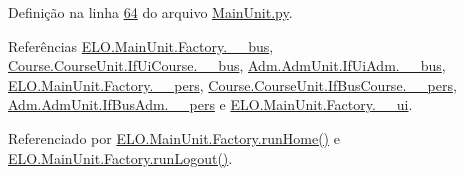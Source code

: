 Definição na linha \hyperlink{MainUnit_8py_source_l00064}{64} do arquivo \hyperlink{MainUnit_8py_source}{Main\-Unit.\-py}.



Referências \hyperlink{MainUnit_8py_source_l00041}{E\-L\-O.\-Main\-Unit.\-Factory.\-\_\-\-\_\-bus}, \hyperlink{CourseUnit_8py_source_l00056}{Course.\-Course\-Unit.\-If\-Ui\-Course.\-\_\-\-\_\-bus}, \hyperlink{AdmUnit_8py_source_l00067}{Adm.\-Adm\-Unit.\-If\-Ui\-Adm.\-\_\-\-\_\-bus}, \hyperlink{MainUnit_8py_source_l00042}{E\-L\-O.\-Main\-Unit.\-Factory.\-\_\-\-\_\-pers}, \hyperlink{CourseUnit_8py_source_l00100}{Course.\-Course\-Unit.\-If\-Bus\-Course.\-\_\-\-\_\-pers}, \hyperlink{AdmUnit_8py_source_l00112}{Adm.\-Adm\-Unit.\-If\-Bus\-Adm.\-\_\-\-\_\-pers} e \hyperlink{MainUnit_8py_source_l00040}{E\-L\-O.\-Main\-Unit.\-Factory.\-\_\-\-\_\-ui}.



Referenciado por \hyperlink{classELO_1_1MainUnit_1_1Factory_a766943202ba781821cf749ca0fb133ba}{E\-L\-O.\-Main\-Unit.\-Factory.\-run\-Home()} e \hyperlink{classELO_1_1MainUnit_1_1Factory_aa26c51486ba65030399897a6e3b4f4f1}{E\-L\-O.\-Main\-Unit.\-Factory.\-run\-Logout()}.


